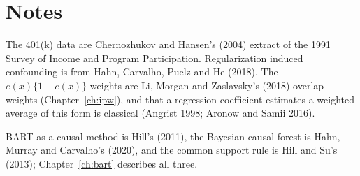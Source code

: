 \section*{Notes}

The 401(k) data are Chernozhukov and Hansen's (2004) extract of the 1991 Survey of Income and Program Participation. Regularization induced confounding is from Hahn, Carvalho, Puelz and He (2018). The $e(x)\{1 - e(x)\}$ weights are Li, Morgan and Zaslavsky's (2018) overlap weights (Chapter~\ref{ch:ipw}), and that a regression coefficient estimates a weighted average of this form is classical (Angrist 1998; Aronow and Samii 2016).

BART as a causal method is Hill's (2011), the Bayesian causal forest is Hahn, Murray and Carvalho's (2020), and the common support rule is Hill and Su's (2013); Chapter~\ref{ch:bart} describes all three.



